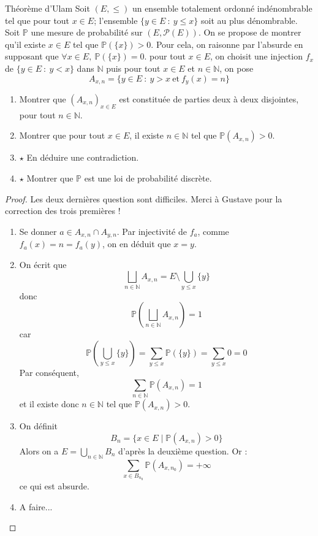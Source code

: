 \documentclass[french,a4paper]{article}
\renewcommand{\P}{\mathbb{P}}
\newcommand{\N}{\mathbb{N}}
\theoremstyle{plain}
\theoremstyle{definition}
\theoremstyle{remark}
\begin{document}
\begin{ex}[Moulin.36]{Théorème d'Ulam}
	Soit $(E,\leqslant)$ un ensemble totalement ordonné indénombrable tel que pour tout $x\in E$; l'ensemble $\{y\in E\ :\ y\leqslant x\}$ soit au plus dénombrable. Soit $\P$ une mesure de probabilité sur $(E,\mathcal{P}(E))$. On se propose de montrer qu'il existe $x\in E$ tel que $\P(\{x\})>0$. Pour cela, on raisonne par l'absurde en supposant que $\forall x\in E,\ \P(\{x\})=0$. pour tout $x\in E$, on choisit une injection $f_x$ de $\{y\in E\ :\ y<x\}$ dans $\N$ puis pour tout $x\in E$ et $n\in\N$, on pose $$A_{x,n}=\{y\in E\ : \ y>x\ \text{et}\ f_y(x)=n\}$$
	\begin{enumerate}
		\item Montrer que $(A_{x,n})_{x\in E}$ est constituée de parties deux à deux disjointes, pour tout $n\in\N$.
		\item Montrer que pour tout $x\in E$, il existe $n\in\N$ tel que $\P(A_{x,n})>0$.
		\item $\star$ En déduire une contradiction.
		\item $\star$ Montrer que $\P$ est une loi de probabilité discrète.
	\end{enumerate}
\end{ex}
\begin{proof}
	Les deux dernières question sont difficiles. Merci à Gustave pour la correction des trois premières !
	\begin{enumerate}
		\item Se donner $a\in A_{x,n}\cap A_{y,n}$. Par injectivité de $f_a$, comme $f_a(x)=n=f_a(y)$, on en déduit que $x=y$.
		\item On écrit que $$\bigsqcup_{n\in\N}A_{x,n}=E\setminus\bigcup_{y\leqslant x}\{y\}$$ donc $$\P\left(\bigsqcup_{n\in\N}A_{x,n}\right)=1$$ car $$\P\left(\bigcup_{y\leqslant x}\{y\}\right)=\sum_{y\leqslant x}\P(\{y\})=\sum_{y\leqslant x}0=0$$ Par conséquent, $$\sum_{n\in\N}\P(A_{x,n})=1$$ et il existe donc $n\in\N$ tel que $\P(A_{x,n})>0$.
		\item On définit $$B_n=\{x\in E\mid \P(A_{x,n})>0\}$$ Alors on a $E=\displaystyle\bigcup_{n\in\N}B_n$ d'après la deuxième question. Or : $$\sum_{x\in B_{n_0}}\P(A_{x,n_0})=+\infty$$ ce qui est absurde.
		\item A faire...
	\end{enumerate}
\end{proof}
\end{document}
